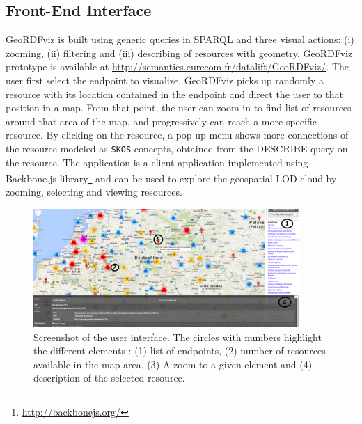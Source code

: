 

\subsection{Front-End Interface}

GeoRDFviz is built using generic queries in SPARQL and three visual actions: (i) zooming, (ii) filtering and (iii) describing of resources with geometry. GeoRDFviz prototype is available at \url{http://semantics.eurecom.fr/datalift/GeoRDFviz/}.
The user first select the endpoint to visualize. GeoRDFviz picks up randomly a resource with its location contained in the endpoint and direct the user to that position in a map. From that point, the user can zoom-in to find list of resources around that area of the map, and progressively can reach a more specific resource. By clicking on the resource, a pop-up menu shows more connections of the resource modeled as \texttt{SKOS} concepts, obtained from the DESCRIBE query on the resource. The application is a client application implemented using Backbone.js library\footnote{\url{http://backbonejs.org/}} and can be used to explore the geospatial LOD cloud by zooming, selecting and viewing resources.

\begin{figure}[!htbp]
\begin{center}
\includegraphics[width=0.9\textwidth]{img/geoRDFvizpic_1200x.png}
\caption{Screenshot of the user interface. The circles with numbers highlight the different elements : (1) list of endpoints, (2) number of resources available in the map area, (3) A zoom to a given element and (4) description of the selected resource.}
\label{fig:geoviz-ui}
\end{center}
\end{figure}


